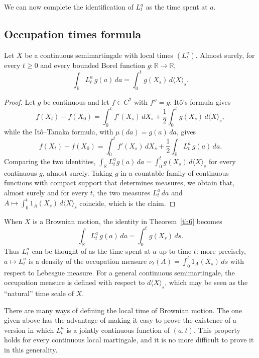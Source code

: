 We can now complete the identification of $L^a_t$ as the time spent at $a$.

\subsection{Occupation times formula}

\begin{theorem}\label{th6}
	Let $X$ be a continuous semimartingale with local times $(L^a_t)$. Almost
	surely, for every $t \geqslant 0$ and every bounded Borel function
	$g:\mathbb{R}\to\mathbb{R}$,
	\[
		\int_\mathbb{R} L^a_t\, g(a)\,da=\int^t_0 g(X_s)\,d\langle X\rangle _s.
	\]
\end{theorem}

\begin{proof}
	Let $g$ be continuous and let $f\in C^2$ with $f''=g$. It\^o's formula
	gives
	\[
		f(X_t)-f(X_0)=\int_0^t f'(X_s)\,dX_s+\frac{1}{2}\int_0^t g(X_s)\,d\langle X\rangle_s,
	\]
	while the It\^o--Tanaka formula, with $\mu(da)=g(a)\,da$, gives
	\[
		f(X_t)-f(X_0)=\int_0^t f'(X_s)\,dX_s+\frac{1}{2}\int_\mathbb{R} L_t^a\, g(a)\,da .
	\]
	Comparing the two identities,
	$\int_\mathbb{R} L_t^a g(a)\,da=\int_0^t g(X_s)\,d\langle X\rangle_s$ for
	every continuous $g$, almost surely. Taking $g$ in a countable family of
	continuous functions with compact support that determines measures, we
	obtain that, almost surely and for every $t$, the two measures
	$L^a_t\,da$ and $A\mapsto \int_0^t 1_A(X_s)\,d\langle X\rangle_s$ coincide,
	which is the claim.
\end{proof}

\begin{remark}
	When $X$ is a Brownian motion, the identity in Theorem~\ref{th6} becomes
	\[
		\int_\mathbb{R} L^a_t\, g(a)\,da=\int^t_0 g(X_s)\,ds .
	\]
	Thus $L_t^a$ can be thought of as the time spent at $a$ up to time $t$:
	more precisely, $a\mapsto L^a_t$ is a density of the occupation measure
	$\nu_t(A)=\int_0^t 1_A(X_s)\,ds$ with respect to Lebesgue measure. For a
	general continuous semimartingale, the occupation measure is defined with
	respect to $d\langle X\rangle_s$, which may be seen as the ``natural'' time
	scale of $X$.
\end{remark}

There are many ways of defining the local time of Brownian motion. The one
given above has the advantage of making it easy to prove the existence of a
version in which $L^a_t$ is a jointly continuous function of $(a,t)$. This
property holds for every continuous local martingale, and it is no more
difficult to prove it in this generality.

